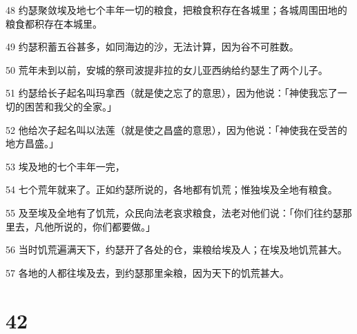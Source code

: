 \par 48 约瑟聚敛埃及地七个丰年一切的粮食，把粮食积存在各城里；各城周围田地的粮食都积存在本城里。
\par 49 约瑟积蓄五谷甚多，如同海边的沙，无法计算，因为谷不可胜数。
\par 50 荒年未到以前，安城的祭司波提非拉的女儿亚西纳给约瑟生了两个儿子。
\par 51 约瑟给长子起名叫玛拿西（就是使之忘了的意思），因为他说：「神使我忘了一切的困苦和我父的全家。」
\par 52 他给次子起名叫以法莲（就是使之昌盛的意思），因为他说：「神使我在受苦的地方昌盛。」
\par 53 埃及地的七个丰年一完，
\par 54 七个荒年就来了。正如约瑟所说的，各地都有饥荒；惟独埃及全地有粮食。
\par 55 及至埃及全地有了饥荒，众民向法老哀求粮食，法老对他们说：「你们往约瑟那里去，凡他所说的，你们都要做。」
\par 56 当时饥荒遍满天下，约瑟开了各处的仓，粜粮给埃及人；在埃及地饥荒甚大。
\par 57 各地的人都往埃及去，到约瑟那里籴粮，因为天下的饥荒甚大。

\chapter{42}

